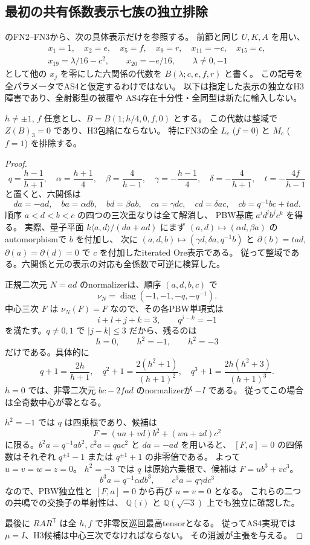 \subsection{最初の共有係数表示七族の独立排除}
\label{subsec:cubic-as4-first-shared}
\cite{AS4lowpinned}のFN2--FN3から、次の具体表示だけを参照する。
前節と同じ $U,K,A$ を用い、
\[
\begin{gathered}
 x_1=1,\quad x_2=e,\quad x_5=f,\quad x_9=r,\quad
 x_{11}=-c,\quad x_{15}=c,\\
 x_{19}=\lambda/16-c^2,\qquad x_{20}=-e/16,
 \qquad\lambda\ne0,-1
\end{gathered}
\]
として他の $x_j$ を零にした六関係の代数を $B(\lambda;c,e,f,r)$ と書く。
この記号を全パラメータでAS4と仮定するわけではない。
以下は指定した表示の独立なH3障害であり、全射影型の被覆や
AS4存在十分性・全同型は新たに輸入しない。

\begin{proposition}\label{prop:cubic-fn-lm}
$h\ne\pm1$, $f$ 任意とし、$B=B(1;h/4,0,f,0)$ とする。
この代数は整域で $Z(B)_3=0$ であり、H3包絡にならない。
特にFN3の全 $L_c$ ($f=0$) と $M_c$ ($f=1$) を排除する。
\end{proposition}
\begin{proof}
\[
 q=\frac{h-1}{h+1},\quad
 \alpha=\frac{h+1}{4},\quad\beta=\frac4{h-1},\quad
 \gamma=-\frac{h-1}{4},\quad\delta=-\frac4{h+1},\quad
 t=-\frac{4f}{h-1}
\]
と置くと、六関係は
\[
 da=-ad,\quad ba=\alpha db,\quad bd=\beta ab,\quad
 ca=\gamma dc,\quad cd=\delta ac,\quad cb=q^{-1}bc+tad.
\]
順序 $a<d<b<c$ の四つの三次重なりは全て解消し、
PBW基底 $a^id^lb^jc^k$ を得る。
実際、量子平面 $k\langle a,d\rangle/(da+ad)$ にまず
$(a,d)\mapsto(\alpha d,\beta a)$ のautomorphismで $b$ を付加し、
次に $(a,d,b)\mapsto(\gamma d,\delta a,q^{-1}b)$ と
$\partial(b)=tad$, $\partial(a)=\partial(d)=0$ で $c$ を付加したiterated Ore表示である。
従って整域である。六関係と元の表示の対応も全係数で可逆に検算した。

正規二次元 $N=ad$ のnormalizerは、順序 $(a,d,b,c)$ で
\[
 \nu_N=\operatorname{diag}(-1,-1,-q,-q^{-1}).
\]
中心三次 $F$ は $\nu_N(F)=F$ なので、その各PBW単項式は
\[
 i+l+j+k=3,\qquad q^{j-k}=-1
\]
を満たす。$q\ne0,1$ で $|j-k|\le3$ だから、残るのは
\[
 h=0,\qquad h^2=-1,\qquad h^2=-3
\]
だけである。具体的に
\[
 q+1=\frac{2h}{h+1},\quad q^2+1=\frac{2(h^2+1)}{(h+1)^2},\quad
 q^3+1=\frac{2h(h^2+3)}{(h+1)^3}.
\]
$h=0$ では、非零二次元 $bc-2f ad$ のnormalizerが $-I$ である。
従ってこの場合は全奇数中心が零となる。

$h^2=-1$ では $q$ は四乗根であり、候補は
\[
 F=(u a+v d)b^2+(w a+z d)c^2
\]
に限る。$b^2a=q^{-1}ab^2$, $c^2a=qac^2$ と $da=-ad$ を用いると、
$[F,a]=0$ の四係数はそれぞれ $q^{\pm1}-1$ または $q^{\pm1}+1$ の非零倍である。
よって $u=v=w=z=0$。
$h^2=-3$ では $q$ は原始六乗根で、候補は $F=u b^3+v c^3$。
\[
 b^3a=q^{-1}\alpha db^3,\qquad c^3a=q\gamma dc^3
\]
なので、PBW独立性と $[F,a]=0$ から再び $u=v=0$ となる。
これらの二つの共鳴での交換子の単射性は、
$\mathbb Q(i)$ と $\mathbb Q(\sqrt{-3})$ 上でも独立に確認した。

最後に $R A R^{\mathsf T}$ は全 $h,f$ で非零反巡回最高tensorとなる。
従ってAS4実現では $\mu=I$、H3候補は中心三次でなければならない。
その消滅が主張を与える。
\end{proof}

